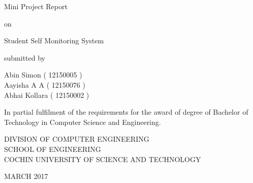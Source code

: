 \vspace*{\fill}

\begin{center}

\fontsize{14pt}{12pt}\selectfont
Mini Project Report

\hspace{0.7em}

on

\hspace{0.7em}
\vspace{0.3in}

\fontsize{20pt}{12pt}

\normalsize
Student Self Monitoring System

\hspace{1em}
\vspace{0.3in}

submitted by

\hspace{1em}
\vspace{0.3in}

\fontsize{14pt}{12pt}\selectfont
Abin Simon ( 12150005 )\\
Aayisha A A ( 12150076 )\\
Abhai Kollara ( 12150002 )

\hspace{1em}
\vspace{0.5in}

\normalsize
In partial fulfilment of the requirements for the award of degree of Bachelor of Technology in Computer Science and Engineering.

\hspace{1em}
\vspace{0.5in}

\fontsize{15pt}{12pt}\selectfont
DIVISION OF COMPUTER ENGINEERING\\
SCHOOL OF ENGINEERING\\
COCHIN UNIVERSITY OF SCIENCE AND TECHNOLOGY

\hspace{1em}

\normalsize
MARCH 2017
\end{center}

\vspace*{\fill}
